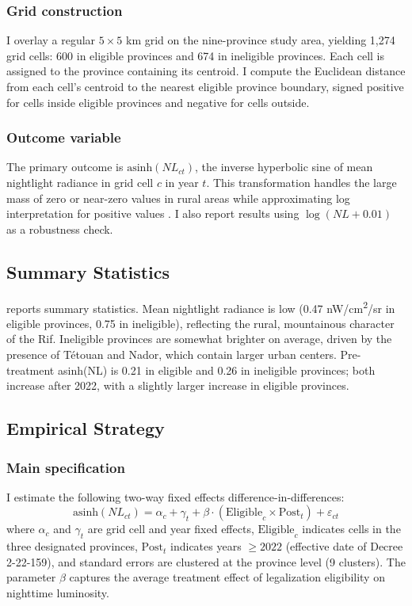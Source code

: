 \documentclass[12pt]{article}
\begin{document}
\subsubsection*{Grid construction} I overlay a regular $5 \times 5$ km grid on the nine-province study area, yielding 1,274 grid cells: 600 in eligible provinces and 674 in ineligible provinces. Each cell is assigned to the province containing its centroid. I compute the Euclidean distance from each cell's centroid to the nearest eligible province boundary, signed positive for cells inside eligible provinces and negative for cells outside.

\subsubsection*{Outcome variable} The primary outcome is $\text{asinh}(NL_{ct})$, the inverse hyperbolic sine of mean nightlight radiance in grid cell $c$ in year $t$. This transformation handles the large mass of zero or near-zero values in rural areas while approximating log interpretation for positive values \citep{Bellemare2020}. I also report results using $\log(NL + 0.01)$ as a robustness check.

\subsection{Summary Statistics}

 reports summary statistics. Mean nightlight radiance is low (0.47 nW/cm\textsuperscript{2}/sr in eligible provinces, 0.75 in ineligible), reflecting the rural, mountainous character of the Rif. Ineligible provinces are somewhat brighter on average, driven by the presence of T\'{e}touan and Nador, which contain larger urban centers. Pre-treatment asinh(NL) is 0.21 in eligible and 0.26 in ineligible provinces; both increase after 2022, with a slightly larger increase in eligible provinces.



\subsection{Empirical Strategy}

\subsubsection*{Main specification} I estimate the following two-way fixed effects difference-in-differences:
\begin{equation}
\text{asinh}(NL_{ct}) = \alpha_c + \gamma_t + \beta \cdot (\text{Eligible}_c \times \text{Post}_t) + \varepsilon_{ct}
\label{eq:did}
\end{equation}
where $\alpha_c$ and $\gamma_t$ are grid cell and year fixed effects, $\text{Eligible}_c$ indicates cells in the three designated provinces, $\text{Post}_t$ indicates years $\geq 2022$ (effective date of Decree 2-22-159), and standard errors are clustered at the province level (9 clusters). The parameter $\beta$ captures the average treatment effect of legalization eligibility on nighttime luminosity.
\end{document}
